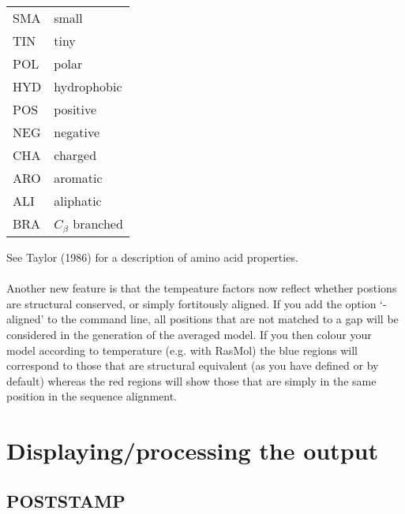 \begin{tabular}{ll}
SMA & small \\
TIN & tiny \\
POL & polar \\
HYD & hydrophobic \\
POS & positive \\
NEG & negative \\
CHA & charged \\
ARO & aromatic \\
ALI & aliphatic \\
BRA & $C_{\beta}$ branched \\
\end{tabular}

See Taylor (1986) for a description of amino acid properties.\\ 
\nocite{taylor86a}
\\
Another new feature is that the tempeature factors now reflect whether
postions are structural conserved, or simply fortitously aligned.  If you
add the option `-aligned' to the command line, all positions that are
not matched to a gap will be considered in the generation of the
averaged model.  If you then colour your model according to temperature
(e.g. with RasMol) the blue regions will correspond to those that
are structural equivalent (as you have defined or by default) whereas
the red regions will show those that are simply in the same position in
the sequence alignment.


\section{Displaying/processing the output}

\subsection{POSTSTAMP}

